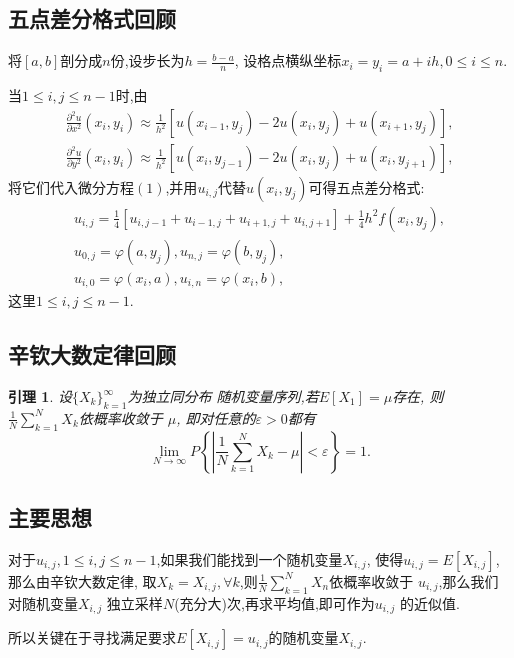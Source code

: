 \documentclass[UTF8,a4paper,notitlepage]{ctexart}%
\newtheorem{lemma}{引理}[section]
\theoremstyle{nonumberplain}
\begin{document}
\subsection{五点差分格式回顾}
将$[a,b]$剖分成$n$份,设步长为$h=\frac{b-a}{n} $,
设格点横纵坐标$x_i=y_i=a+ih,0\leq i\leq n $.\par
当$1\leq i,j\leq n-1 $时,由
\begin{gather}%
    \frac{\partial ^2 u}{\partial  x^2}(x_i,y_i)\approx 
    \frac{1}{h^2}[u(x_{i-1},y_j)-2u(x_i,y_j)+u(x_{i+1},y_j)], \nonumber\\
    \frac{\partial ^2 u}{\partial  y^2}(x_i,y_i)\approx 
    \frac{1}{h^2}[u(x_{i},y_{j-1})-2u(x_i,y_j)+u(x_{i},y_{j+1})],\nonumber
\end{gather}
将它们代入微分方程$(1)$,并用$u_{i,j}$代替$u(x_i,y_j)$可得五点差分格式:
\begin{gather}%
    u_{i,j}=\frac{1}{4}[u_{i,j-1}+u_{i-1,j}+u_{i+1,j}+u_{i,j+1}]
    +\frac{1}{4}h^2f(x_i,y_j), \\
    u_{0,j}=\varphi (a,y_j),u_{n,j}=\varphi (b,y_j),\\
    u_{i,0}=\varphi (x_i,a),u_{i,n}=\varphi (x_i,b),
\end{gather}
这里$1\leq i,j\leq n-1$.
\subsection{辛钦大数定律回顾}
\begin{lemma}
    设$\{X_k\}_{k=1}^{\infty}$为独立同分布
    随机变量序列,若$E[X_1]=\mu $存在,
    则 $\frac{1}{N}\sum_{k = 1}^{N}X_k$依概率收敛于
    $\mu$,
    即对任意的$\varepsilon >0$都有
    \begin{equation*}
      \lim_{N \to \infty}  P\left\{\left\lvert \frac{1}{N}\sum_{k= 1}^{N} X_k -\mu\right\rvert<\varepsilon  \right\} =1  .  
    \end{equation*}    
\end{lemma}
\subsection{主要思想}
对于$u_{i,j},1\leq i,j\leq n-1$,如果我们能找到一个随机变量$X_{i,j}$,
使得$u_{i,j}=E[X_{i,j}]$,那么由辛钦大数定律,
取$X_k=X_{i,j},\forall k$,则$\frac{1}{N}\sum_{k = 1}^{N}X_n$依概率收敛于
$u_{i,j}$,那么我们对随机变量$X_{i,j}$
独立采样$N$(充分大)次,再求平均值,即可作为$u_{i,j}$
的近似值.\par
所以关键在于寻找满足要求$E[X_{i,j}]=u_{i,j}$的随机变量$X_{i,j}$.
\end{document}
